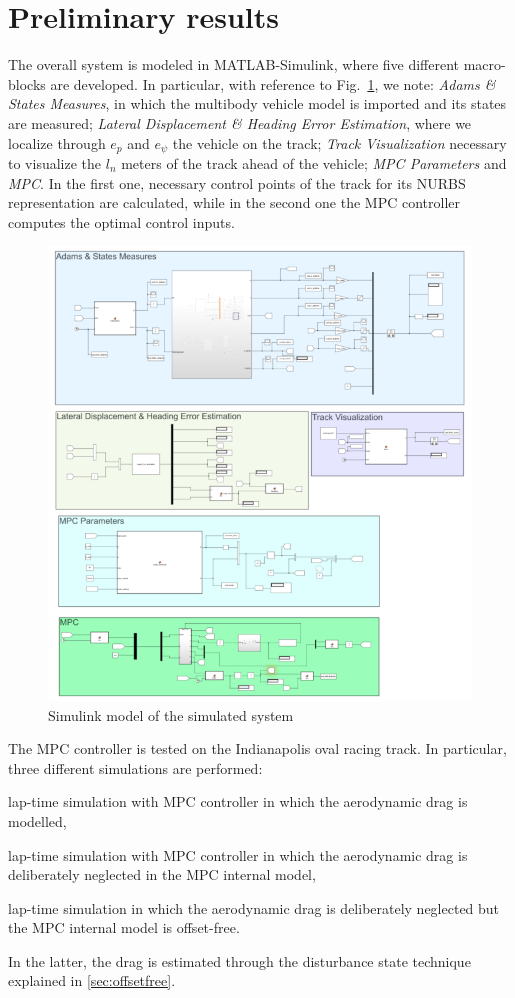 \documentclass[conference]{IEEEtran} %
\begin{document}
\section{Preliminary results}
The overall system is modeled in MATLAB-Simulink, where five different macro-blocks are developed. In particular, with reference to Fig.~\ref{fig:simulink_blocks}, we note: \textit{Adams \& States Measures}, in which the multibody vehicle model is imported and its states are measured; \textit{Lateral Displacement \& Heading Error Estimation}, where we localize through $e_p$ and $e_\psi$ the vehicle on the track; \textit{Track Visualization} necessary to visualize the $l_n$ meters of the track ahead of the vehicle; \textit{MPC Parameters} and \textit{MPC}. In the first one, necessary control points of the track for its NURBS~\cite{nurbs} representation are calculated, while in the second one the MPC controller computes the optimal control inputs.
\begin{figure}[htb] \centering
	\includegraphics[width=1.\linewidth]{simulink_blocks}
	\caption{Simulink model of the simulated system}
	\label{fig:simulink_blocks}
\end{figure}
The MPC controller is tested on the Indianapolis oval racing track. In particular, three different simulations are performed:
\begin{enumerate*}[label=(\roman*)]
	\item lap-time simulation with MPC controller in which the aerodynamic drag is modelled,
	\item lap-time simulation with MPC controller in which the aerodynamic drag is deliberately neglected in the MPC internal model,
	\item lap-time simulation in which the aerodynamic drag is deliberately neglected but the MPC internal model is offset-free.
\end{enumerate*}
In the latter, the drag is estimated through the disturbance state technique explained in \ref{sec:offsetfree}.
\end{document}

